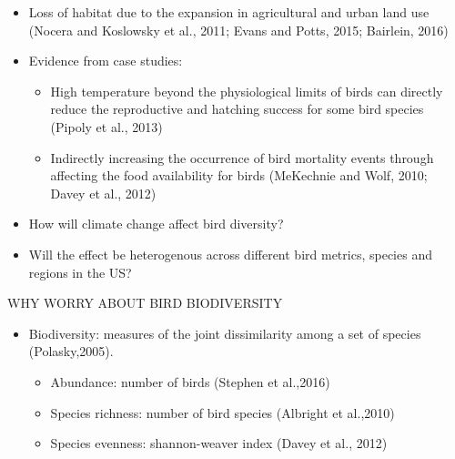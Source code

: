 \documentclass{beamer}
\begin{document}
\begin{frame}
\begin{itemize}
  \item Loss of habitat due to the expansion in agricultural and urban land use (Nocera and Koslowsky et al., 2011; Evans and Potts, 2015; Bairlein, 2016)
  \item Evidence from case studies:
  \begin{itemize}
  \item High temperature beyond the physiological limits of birds can directly reduce the reproductive and hatching success for some bird species (Pipoly et al., 2013)
  \item Indirectly increasing the occurrence of bird mortality events through affecting the food availability for birds (MeKechnie and Wolf, 2010; Davey et al., 2012)
   \end{itemize}
\end{itemize}
\end{frame}

\begin{frame}
  \begin{itemize}
    \item How will climate change affect bird diversity?
    \item Will the effect be heterogenous across different bird metrics, species and regions in the US?
  \end{itemize}
\end{frame}

\begin{frame}{WHY WORRY ABOUT BIRD BIODIVERSITY}
  \begin{itemize}
    \item Biodiversity: measures of the joint dissimilarity among a set of species (Polasky,2005).
    \begin{itemize}
      \item Abundance: number of birds (Stephen et al.,2016)
      \item Species richness: number of bird species (Albright et al.,2010)
      \item Species evenness: shannon-weaver index (Davey et al., 2012)
    \end{itemize}
  \end{itemize}
\end{frame}
\end{document}
